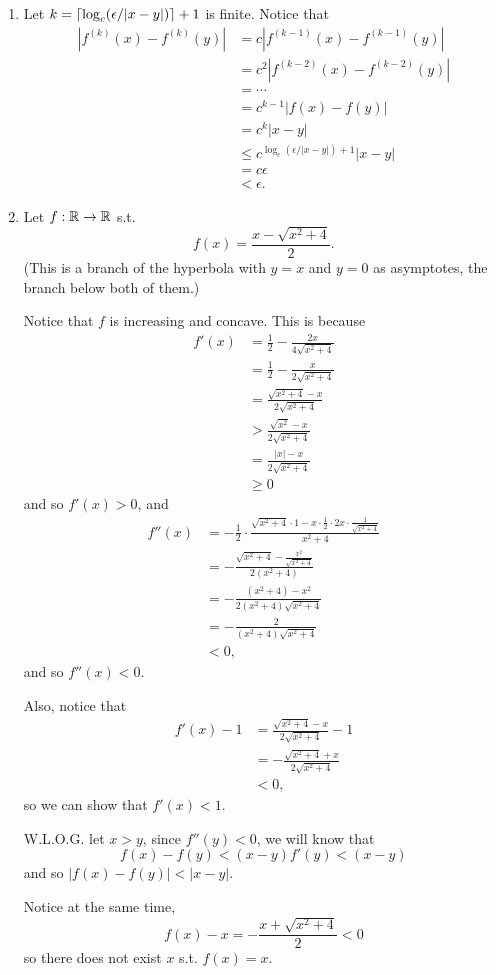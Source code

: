\begin{enumerate}
    \item Let \(k = \lceil\log_c(\epsilon/|x-y|)\rceil + 1\) is finite. Notice that 
    \begin{align*}
        |f^{(k)}(x) - f^{(k)}(y)| &= c|f^{(k-1)}(x) - f^{(k-1)}(y)|\\
        &= c^2|f^{(k-2)}(x) - f^{(k-2)}(y)|\\
        &= \cdots\\
        &= c^{k-1}|f(x) - f(y)|\\
        &= c^k |x - y|\\
        &\leq c^{\log_c(\epsilon/|x-y|)+1} |x-y|\\
        &= c\epsilon\\
        &< \epsilon.
    \end{align*}
    
    \item Let \(f: \mathbb{R} \to \mathbb{R}\) s.t.
    \[
        f(x) = \frac{x-\sqrt{x^2+4}}{2}.
    \]
    (This is a branch of the hyperbola with \(y=x\) and \(y=0\) as asymptotes, the branch below both of them.)

    Notice that \(f\) is increasing and concave. This is because
    \begin{align*}
        f'(x) &= \frac{1}{2} - \frac{2x}{4\sqrt{x^2+4}}\\
        &= \frac{1}{2} - \frac{x}{2\sqrt{x^2+4}}\\
        &= \frac{\sqrt{x^2+4}-x}{2\sqrt{x^2+4}}\\
        &> \frac{\sqrt{x^2}-x}{2\sqrt{x^2+4}}\\
        &= \frac{|x|-x}{2\sqrt{x^2+4}}\\
        &\geq 0
    \end{align*}
    and so \(f'(x)>0\), and
    \begin{align*}
        f''(x) &= -\frac{1}{2} \cdot \frac{\sqrt{x^2+4} \cdot 1 - x \cdot \frac{1}{2} \cdot 2x \cdot \frac{1}{\sqrt{x^2+4}}}{x^2+4}\\
        &= -\frac{\sqrt{x^2+4} - \frac{x^2}{\sqrt{x^2+4}}}{2(x^2+4)}\\
        &= -\frac{(x^2+4) - x^2}{2(x^2+4)\sqrt{x^2+4}}\\
        &= -\frac{2}{(x^2+4)\sqrt{x^2+4}}\\
        &< 0,
    \end{align*}
    and so \(f''(x) < 0\).
    
    Also, notice that
    \begin{align*}
        f'(x) - 1 &= \frac{\sqrt{x^2 + 4} -x }{2\sqrt{x^2 + 4}} - 1\\
        &= - \frac{\sqrt{x^2 + 4} +x }{2\sqrt{x^2 + 4}}\\
        &<0,
    \end{align*}
    so we can show that \(f'(x) < 1\).
    
    W.L.O.G. let \(x > y\), since \(f''(y) < 0\), we will know that
    \[
        f(x) - f(y) < (x - y)f'(y) < (x-y)
    \]
    and so \(|f(x) - f(y)| < |x-y|\).
    
    Notice at the same time,
    \[
    f(x) - x = -\frac{x+\sqrt{x^2+4}}{2} < 0
    \]
    so there does not exist \(x\) s.t. \(f(x) = x\).
\end{enumerate}
